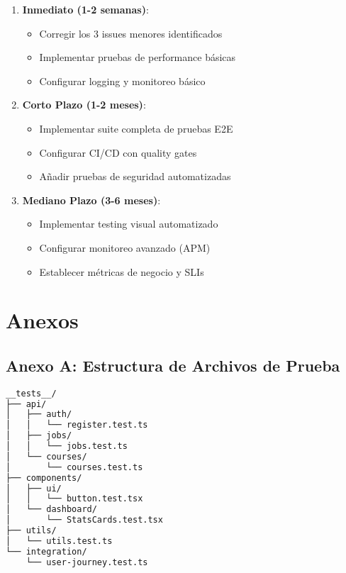 \documentclass[12pt,a4paper]{article}
\begin{document}
\begin{enumerate}
    \item \textbf{Inmediato (1-2 semanas)}:
    \begin{itemize}
        \item Corregir los 3 issues menores identificados
        \item Implementar pruebas de performance básicas
        \item Configurar logging y monitoreo básico
    \end{itemize}
    
    \item \textbf{Corto Plazo (1-2 meses)}:
    \begin{itemize}
        \item Implementar suite completa de pruebas E2E
        \item Configurar CI/CD con quality gates
        \item Añadir pruebas de seguridad automatizadas
    \end{itemize}
    
    \item \textbf{Mediano Plazo (3-6 meses)}:
    \begin{itemize}
        \item Implementar testing visual automatizado
        \item Configurar monitoreo avanzado (APM)
        \item Establecer métricas de negocio y SLIs
    \end{itemize}
\end{enumerate}

\section{Anexos}

\subsection{Anexo A: Estructura de Archivos de Prueba}

\begin{lstlisting}[language=bash, caption=Estructura del Directorio de Pruebas]
__tests__/
├── api/
│   ├── auth/
│   │   └── register.test.ts
│   ├── jobs/
│   │   └── jobs.test.ts
│   └── courses/
│       └── courses.test.ts
├── components/
│   ├── ui/
│   │   └── button.test.tsx
│   └── dashboard/
│       └── StatsCards.test.tsx
├── utils/
│   └── utils.test.ts
└── integration/
    └── user-journey.test.ts
\end{lstlisting}
\end{document}
